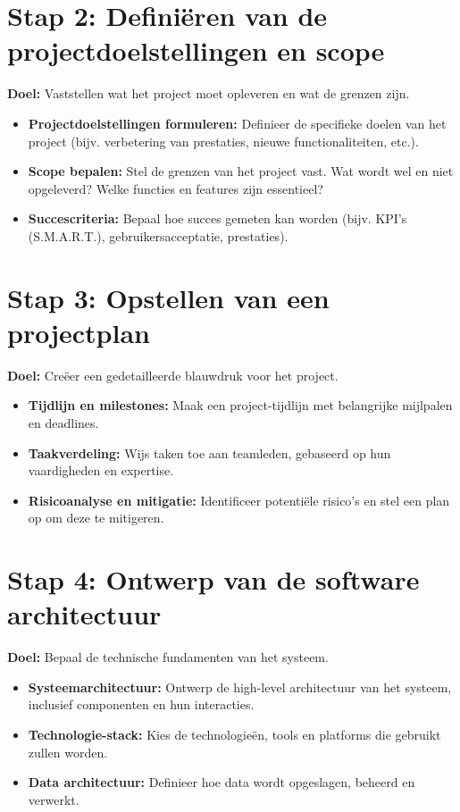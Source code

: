 \documentclass[8pt]{extarticle}
\begin{document}
%
%


\section*{Stap 2: Definiëren van de projectdoelstellingen en scope}
\textbf{Doel:} Vaststellen wat het project moet opleveren en wat de grenzen zijn.

\begin{itemize}
    \item \textbf{Projectdoelstellingen formuleren:} Definieer de specifieke doelen van het project (bijv. verbetering van prestaties, nieuwe functionaliteiten, etc.).
    \item \textbf{Scope bepalen:} Stel de grenzen van het project vast. Wat wordt wel en niet opgeleverd? Welke functies en features zijn essentieel?
    \item \textbf{Succescriteria:} Bepaal hoe succes gemeten kan worden (bijv. KPI’s (S.M.A.R.T.), gebruikersacceptatie, prestaties).
\end{itemize}

%
%

\section*{Stap 3: Opstellen van een projectplan}
\textbf{Doel:} Creëer een gedetailleerde blauwdruk voor het project.

\begin{itemize}
    \item \textbf{Tijdlijn en milestones:} Maak een project-tijdlijn met belangrijke mijlpalen en deadlines.
    \item \textbf{Taakverdeling:} Wijs taken toe aan teamleden, gebaseerd op hun vaardigheden en expertise.
    \item \textbf{Risicoanalyse en mitigatie:} Identificeer potentiële risico’s en stel een plan op om deze te mitigeren.
\end{itemize}

%
%

\section*{Stap 4: Ontwerp van de software architectuur}
\textbf{Doel:} Bepaal de technische fundamenten van het systeem.

\begin{itemize}
    \item \textbf{Systeemarchitectuur:} Ontwerp de high-level architectuur van het systeem, inclusief componenten en hun interacties.
    \item \textbf{Technologie-stack:} Kies de technologieën, tools en platforms die gebruikt zullen worden.
    \item \textbf{Data architectuur:} Definieer hoe data wordt opgeslagen, beheerd en verwerkt.
\end{itemize}
\end{document}
